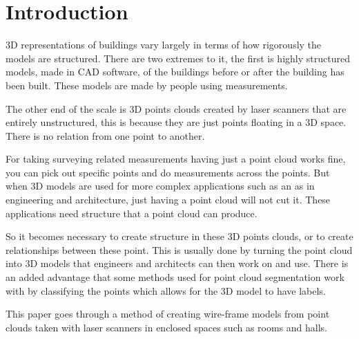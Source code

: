 
\section{Introduction}



3D representations of buildings vary largely in terms of how rigorously the models are structured. There are two extremes to it, the first is highly structured models, made in CAD software, of the buildings before or after the building has been built. These models are made by people using measurements.

The other end of the scale is 3D points clouds created by laser scanners that are entirely unstructured, this is because they are just points floating in a 3D space. There is no relation from one point to another.

For taking surveying related measurements having just a point cloud works fine, you can pick out specific points and do measurements across the points. But when 3D models are used for more complex applications such as an as in engineering and architecture, just having a point cloud will not cut it. These applications need structure that a point cloud can produce.

So it becomes necessary to create structure in these 3D points clouds, or to create relationships between these point. This is usually done by turning the point cloud into 3D models that engineers and architects can then work on and use. There is an added advantage that some methods used for point cloud segmentation work with by classifying the points which allows for the 3D model to have labels.



This paper goes through a method of creating wire-frame models from point clouds taken with laser scanners in enclosed spaces such as rooms and halls. 












